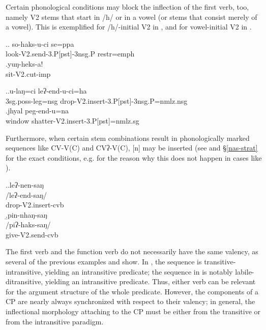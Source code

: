 Certain phonological conditions may block the inflection of the first verb, too, namely V2 stems that start in  /h/ or in a vowel (or stems that consist merely of a vowel). This is exemplified for /h/-initial V2 in \Next, and for vowel-initial V2 in \NNext.

\ex.\ag. so-haks-u-ci se=ppa\\
look{\sc -V2.send-3.P[pst]-3nsg.P} {\sc restr=emph}\\
 
\bg.yuŋ-heks-a!\\
sit{\sc -V2.cut-imp}\\


\ex.\ag.u-laŋ=ci leʔ-end-u-ci=ha\\
{\sc 3sg.poss-}leg{\sc =nsg} drop{\sc -V2.insert-3.P[pst]-3nsg.P=nmlz.nsg}\\
\bg.jhyal peg-end-u=na\\
window shatter{\sc -V2.insert-3.P[pst]=nmlz.sg}\\

Furthermore, when  certain stem combinations result in phonologically marked sequences like CV-V(C) and CVʔ-V(C), [n] may be inserted (see  \Next and  §\ref{nas-strat} for the exact conditions, e.g. for the reason why this does not happen in cases like \Last[a]).

\ex.\a.\glll leʔ-nen-saŋ\\
/leʔ-end-saŋ/\\
drop{\sc -V2.insert-cvb}\\
\b.\glll pin-nhaŋ-saŋ\\
/piʔ-haks-saŋ/\\
give{\sc -V2.send-cvb}\\


The first verb and the function verb do not necessarily have the same valency, as several of the previous examples and \Next show. In \Next[a], the sequence is transitive-intransitive, yielding an intransitive predicate; the sequence in \Next[b]  is notably labile-ditransitive, yielding an intransitive predicate. Thus, either  verb can be relevant for the argument structure of the whole predicate. However, the components of a CP are nearly always synchronized with respect to their valency; in general, the inflectional morphology attaching to the CP must be either from the transitive or from the intransitive paradigm. 

